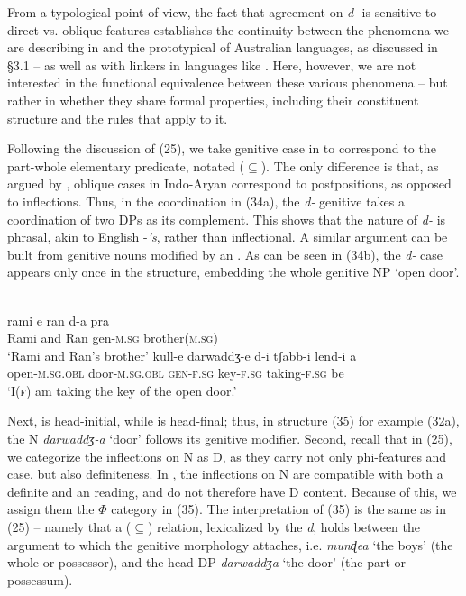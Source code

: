 \documentclass[output=paper]{langsci/langscibook}
\begin{document}
From a typological point of view, the fact that agreement on \textit{d}{}- is sensitive to direct vs. oblique features establishes the continuity between the phenomena we are describing in  and the prototypical  of Australian languages, as discussed in §3.1 – as well as with linkers in languages like . Here, however, we are not interested in the functional equivalence between these various phenomena – but rather in whether they share formal properties, including their constituent structure and the rules that apply to it.    

Following the discussion of  (25), we take genitive case in  to correspond to the part-whole elementary predicate, notated ($\subseteq$). The only difference is that, as argued by \citet{Payne1995}, oblique cases in Indo-Aryan correspond to postpositions, as opposed to inflections. Thus, in the coordination in (34a), the \textit{d-} genitive  takes a coordination of two DPs as its complement. This shows that the nature of \textit{d-} is phrasal, akin to English -\textit{’s}, rather than inflectional. A similar argument can be built from genitive nouns modified by an . As can be seen in (34b), the \textit{d-} case  appears only once in the structure, embedding the whole genitive NP ‘open door’.

\ea%
    \label{ex:manzini:34}\\
    \ea
    \gll    rami   e   ran   d-a   pra\\
              Rami   and  Ran  gen-\textsc{m.sg}  brother\textsc{(m.sg)}  \\
    \glt     ‘Rami and Ran’s brother’
    \ex  
    \gll    kull-e   darwaddʒ-e  d-i   tʃabb-i   lend-i   a  \\
             open-\textsc{m.sg.obl}   door-\textsc{m.sg.obl}  \textsc{gen-f.sg}   key-\textsc{f.sg}  taking-\textsc{f.sg}  be \\
    \glt     ‘I(\textsc{f}) am taking the key of the open door.’ 
    \z
\z

Next,  is head-initial, while  is head-final; thus, in structure (35) for example (32a), the N \textit{darwaddʒ-a} ‘door’ follows its genitive modifier. Second, recall that in  (25), we categorize the inflections on N as D, as they carry not only phi-features and case, but also definiteness. In , the inflections on N are compatible with both a definite and an  reading, and do not therefore have D content. Because of this, we assign them the $\Phi $ category in (35). The interpretation of (35) is the same as in  (25) – namely that a ($\subseteq$) relation, lexicalized by the  \textit{d}, holds between the argument to which the genitive morphology attaches, i.e. \textit{munɖea} ‘the boys’ (the whole or possessor), and the head DP \textit{darwaddʒ}\textit{a} ‘the door’ (the part or possessum).
\end{document}
